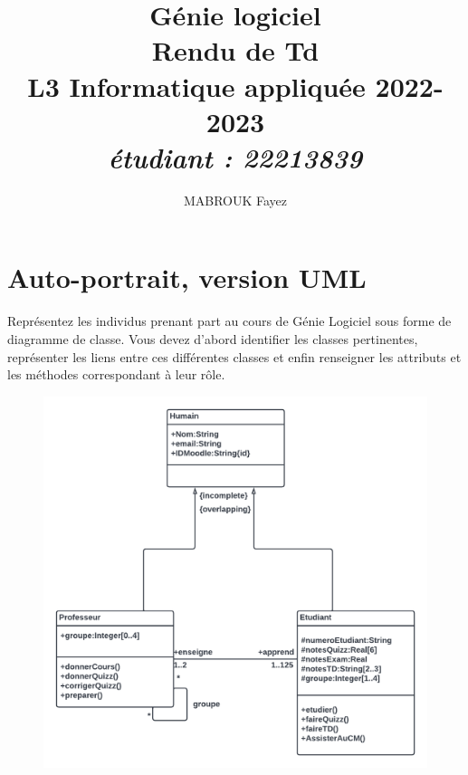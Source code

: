 \documentclass[12pt]{article}
\date{}
\author{MABROUK Fayez}
\title{{\bf  Génie logiciel} \\
	Rendu de Td \no 10  \\
	{\small L3 Informatique appliquée 2022-2023} \\
	{\it \small \no étudiant : 22213839}}
\begin{document}
	\maketitle
	\newpage
	\section{Auto-portrait, version UML}
Représentez les individus prenant part au cours de Génie Logiciel sous forme de diagramme de
classe. Vous devez d’abord identifier les classes pertinentes, représenter les liens entre ces
différentes classes et enfin renseigner les attributs et les méthodes correspondant à leur rôle.
	\begin{figure}[!hbtp]
	\centering
	\includegraphics[scale=0.75]{Capture1.png}
\end{figure}
\end{document}
